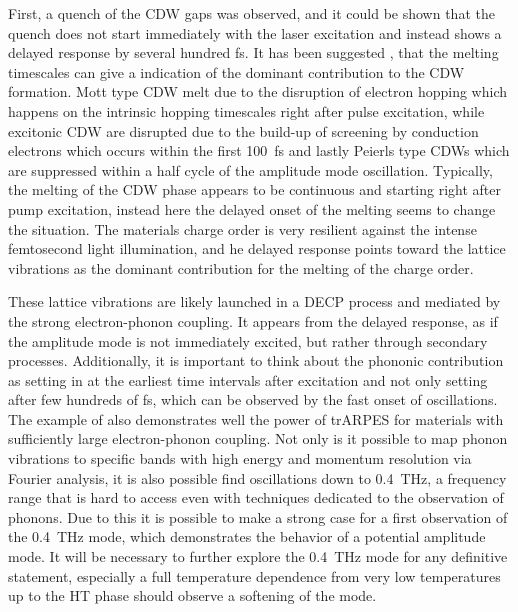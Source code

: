 First, a quench of the CDW gaps was observed, and it could be shown that the quench does not start immediately with the laser excitation and instead shows a delayed response by several hundred \unit{\femto\second}.
It has been suggested \cite{hellmann_time-domain_2012}, that the melting timescales can give a indication of the dominant contribution to the CDW formation.
Mott type CDW melt due to the disruption of electron hopping which happens on the intrinsic hopping timescales right after pulse excitation, while excitonic CDW are disrupted due to the build-up of screening by conduction electrons which occurs within the first \qty{100}{\femto\second} and lastly Peierls type CDWs which are suppressed within a half cycle of the amplitude mode oscillation.
Typically, the melting of the CDW phase appears to be continuous and starting right after pump excitation, instead here the delayed onset of the melting seems to change the situation.
The materials charge order is very resilient against the intense femtosecond light illumination, and he delayed response points toward the lattice vibrations as the dominant contribution for the melting of the charge order. 

These lattice vibrations are likely launched in a DECP process and mediated by the strong electron-phonon coupling.
It appears from the delayed response, as if the amplitude mode is not immediately excited, but rather through secondary processes.
Additionally, it is important to think about the phononic contribution as setting in at the earliest time intervals after excitation and not only setting after few hundreds of \unit{\femto\second}, which can be observed by the fast onset of oscillations.
The example of  also demonstrates well the power of trARPES for materials with sufficiently large electron-phonon coupling.
Not only is it possible to map phonon vibrations to specific bands with high energy and momentum resolution via Fourier analysis, it is also possible find oscillations down to \qty{0.4}{\tera\hertz}, a frequency range that is hard to access even with techniques dedicated to the observation of phonons.
Due to this it is possible to make a strong case for a first observation of the \qty{0.4}{\tera\hertz} mode, which demonstrates the behavior of a potential amplitude mode.
It will be necessary to further explore the \qty{0.4}{\tera\hertz} mode for any definitive statement, especially a full temperature dependence from very low temperatures up to the HT phase should observe a softening of the mode.

